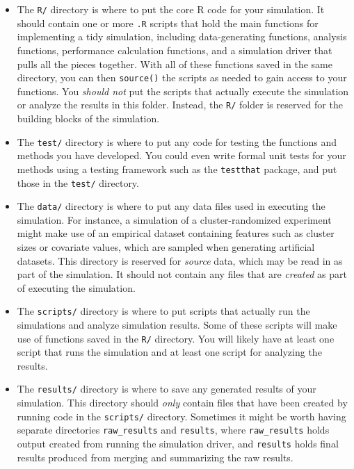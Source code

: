 \documentclass[
]{book}
\begin{document}
\begin{itemize}
\item
  The \texttt{R/} directory is where to put the core R code for your simulation.
  It should contain one or more \texttt{.R} scripts that hold the main functions for implementing a tidy simulation, including data-generating functions, analysis functions, performance calculation functions, and a simulation driver that pulls all the pieces together.
  With all of these functions saved in the same directory, you can then \texttt{source()} the scripts as needed to gain access to your functions.
  You \emph{should not} put the scripts that actually execute the simulation or analyze the results in this folder.
  Instead, the \texttt{R/} folder is reserved for the building blocks of the simulation.
\item
  The \texttt{test/} directory is where to put any code for testing the functions and methods you have developed.
  You could even write formal unit tests for your methods using a testing framework such as the \texttt{testthat} package, and put those in the \texttt{test/} directory.
\item
  The \texttt{data/} directory is where to put any data files used in executing the simulation.
  For instance, a simulation of a cluster-randomized experiment might make use of an empirical dataset containing features such as cluster sizes or covariate values, which are sampled when generating artificial datasets.
  This directory is reserved for \emph{source} data, which may be read in as part of the simulation.
  It should not contain any files that are \emph{created} as part of executing the simulation.
\item
  The \texttt{scripts/} directory is where to put scripts that actually run the simulations and analyze simulation results.
  Some of these scripts will make use of functions saved in the \texttt{R/} directory.
  You will likely have at least one script that runs the simulation and at least one script for analyzing the results.
\item
  The \texttt{results/} directory is where to save any generated results of your simulation.
  This directory should \emph{only} contain files that have been created by running code in the \texttt{scripts/} directory.
  Sometimes it might be worth having separate directories \texttt{raw\_results} and \texttt{results}, where \texttt{raw\_results} holds output created from running the simulation driver, and \texttt{results} holds final results produced from merging and summarizing the raw results.
\end{itemize}
\end{document}
